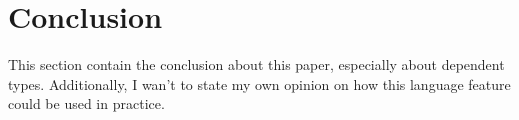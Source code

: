 \section{Conclusion}
This section contain the conclusion about this paper, especially about dependent types. 
Additionally, I wan't to state my own opinion on how this language feature could be used in practice.